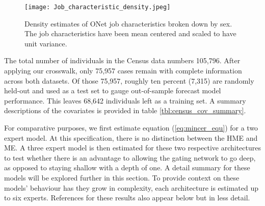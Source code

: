 \documentclass[12pt]{article}
\begin{document}
\begin{figure}[t!]
  \texttt{[image: Job\_characteristic\_density.jpeg]}
  \caption{Density estimates of ONet job characteristics broken down by
  sex. The job characteristics have been mean centered and scaled to
  have unit variance.}
  \label{fig:JobChar_vs_sex}
\end{figure}



The total number of individuals in the Census data numbers 105,796.
After applying our crosswalk, only 75,957 cases remain with complete
information across both datasets. Of those 75,957, roughly ten percent
(7,315) are randomly held-out and used as a test set to gauge
out-of-sample forecast model performance. This leaves 68,642 individuals left
as a training set. A summary descriptions of the covariates is provided
in table \ref{tbl:census_cov_summary}.

For comparative purposes, we first estimate equation (\ref{eq:mincer_equ}) 
for a two expert model. At this specification, there is no distinction
between the HME and ME. A three expert model is then estimated for these two
respective architectures to test whether there is an advantage to allowing 
the gating network to go deep, as opposed to staying shallow with a depth of one.
A detail summary for these models will be explored further in this section.
To provide context on these models' behaviour has they grow in complexity, each
architecture is estimated up to six experts. References for these results also
appear below but in less detail.
\end{document}
